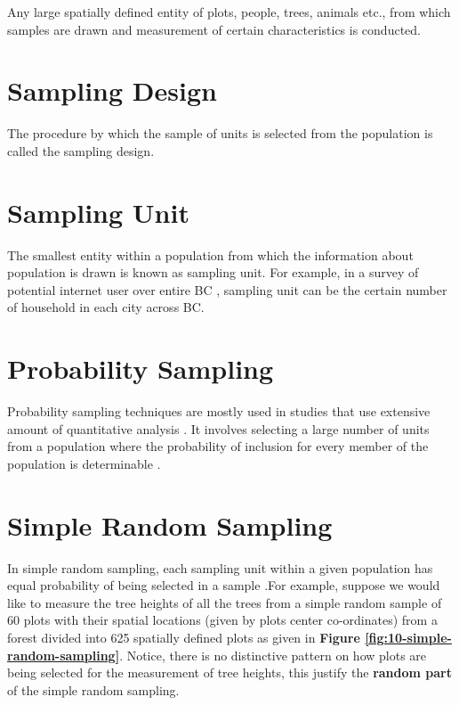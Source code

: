 \documentclass[
]{book}
\begin{document}
Any large spatially defined entity of plots, people, trees, animals etc., from which samples are drawn and measurement of certain characteristics is conducted.

\hypertarget{sampling-design}{%
\section{Sampling Design}\label{sampling-design}}

The procedure by which the sample of units is selected from the population is called the sampling design.

\hypertarget{sampling-unit}{%
\section{Sampling Unit}\label{sampling-unit}}

The smallest entity within a population from which the information about population is drawn is known as sampling unit. For example, in a survey of potential internet user over entire BC , sampling unit can be the certain number of household in each city across BC.

\hypertarget{probability-sampling}{%
\section{Probability Sampling}\label{probability-sampling}}

Probability sampling techniques are mostly used in studies that use extensive amount of quantitative analysis \citep{tashakkori_sage_2010}. It involves selecting a large number of units from a population where the probability of inclusion for every member of the population is determinable \citep{tashakkori_sage_2010}.

\hypertarget{simple-random-sampling}{%
\section{Simple Random Sampling}\label{simple-random-sampling}}

In simple random sampling, each sampling unit within a given population has equal probability of being selected in a sample \citep{thompson_sampling_2012}.For example, suppose we would like to measure the tree heights of all the trees from a simple random sample of 60 plots with their spatial locations (given by plots center co-ordinates) from a forest divided into 625 spatially defined plots as given in \textbf{Figure \ref{fig:10-simple-random-sampling}}. Notice, there is no distinctive pattern on how plots are being selected for the measurement of tree heights, this justify the \textbf{random part} of the simple random sampling.
\end{document}
